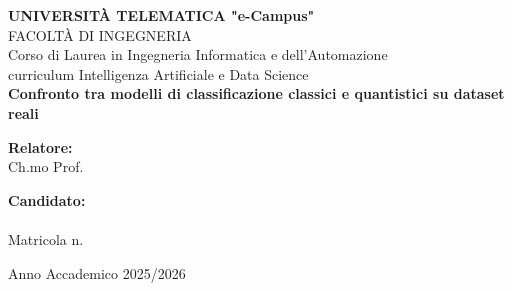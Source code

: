 
\begin{titlepage}
\centering

\vspace*{1cm}


    \begin{center}
        \large
        \textbf{UNIVERSITÀ TELEMATICA "e-Campus"} \\
        \vspace{0.7cm}
        FACOLTÀ DI \MakeUppercase{INGEGNERIA} \\[0.3cm]
        Corso di Laurea in Ingegneria Informatica e dell'Automazione \\
        curriculum Intelligenza Artificiale e Data Science \\

        
        \vspace{3.5cm}
        \Large
        \textbf{Confronto tra modelli di classificazione classici e quantistici su dataset reali} \\
        \vspace{0.5cm}
        \large
        
        \vfill %
        
        \large
        \begin{minipage}[t]{0.45\textwidth}
            \textbf{Relatore:} \\
            Ch.mo Prof. \supervisorfullname \\
        \end{minipage}
        \hfill
        \begin{minipage}[t]{0.45\textwidth}
            \vspace{2cm}
            \raggedleft
            \textbf{Candidato:} \\
            \studentfullname \\
            Matricola n. \studentnumber \\
            \vspace{0.4cm}
        \end{minipage}
        
        \vspace{2.5cm}
        \large
        Anno Accademico 2025/2026
    \end{center}


\end{titlepage}

\clearpage